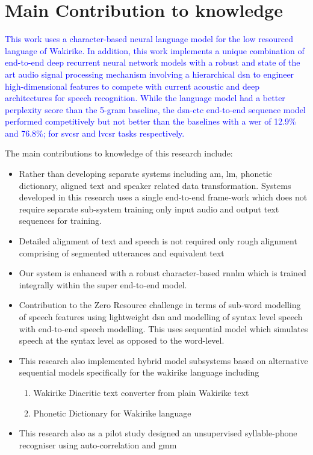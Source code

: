 \section{Main Contribution to knowledge}
\textcolor{blue}{This work uses a character-based neural language model for the low resourced language of Wakirike.  In addition, this work implements a unique combination of end-to-end deep recurrent neural network models with a robust and state of the art audio signal processing mechanism involving a hierarchical \acrfull{dsn} to engineer high-dimensional features to compete with current acoustic and deep architectures for speech recognition. While the language model had a better perplexity score than the 5-gram baseline, the \acrshort{dsn}-\acrshort{ctc} end-to-end sequence model performed competitively but not better than the baselines with a \acrlong{wer} of 12.9\% and 76.8\%; for \acrshort{svcsr} and \acrshort{lvcsr} tasks respectively.}

\startblue
The main contributions to knowledge of this research include:
\begin{itemize}
    \item Rather than developing separate systems including \acrlong{am}, \acrlong{lm}, phonetic dictionary, aligned text and speaker related data transformation.  Systems developed in this research uses a single end-to-end frame-work which does not require separate sub-system training only input audio and output text sequences for training.
    \item Detailed alignment of text and speech is not required only rough alignment comprising of segmented utterances and equivalent text
    \item Our system is enhanced with a robust character-based \acrlong{rnnlm} which is trained integrally within the super end-to-end model.
    \item Contribution to the Zero Resource challenge \citep{versteegh2015zero} in terms of sub-word modelling of speech features using lightweight \acrfull{dsn} and modelling of syntax level speech with end-to-end speech modelling.  This uses sequential model which simulates speech at the syntax level as opposed to the word-level.
    \item This research also implemented hybrid model subsystems based on alternative sequential models specifically for the wakirike language including
\begin{enumerate}
    \item Wakirike Diacritic text converter from plain Wakirike text 
    \item Phonetic Dictionary for Wakirike language
\end{enumerate}
    \item This research also as a pilot study designed an unsupervised syllable-phone recogniser using auto-correlation and \acrfull{gmm}
\end{itemize}



